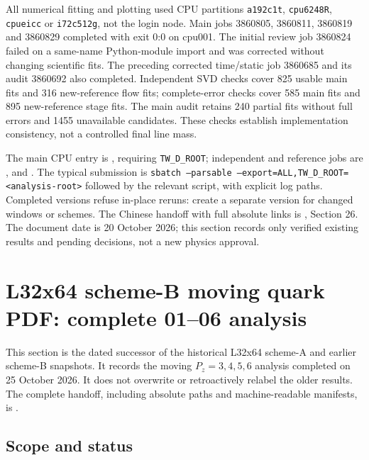 \documentclass[11pt]{article}
\numberwithin{equation}{section}
\begin{document}
All numerical fitting and plotting used CPU partitions
\texttt{a192c1t}, \texttt{cpu6248R}, \texttt{cpueicc} or
\texttt{i72c512g}, not the login node. Main jobs 3860805, 3860811,
3860819 and 3860829 completed with exit 0:0 on cpu001. The initial review
job 3860824 failed on a same-name Python-module import and was corrected
without changing scientific fits. The preceding corrected time/static
job 3860685 and its audit 3860692 also completed. Independent SVD checks
cover 825 usable main fits and 316 new-reference flow fits; complete-error
checks cover 585 main fits and 895 new-reference stage fits. The main
audit retains 240 partial fits without full errors and 1455 unavailable
candidates. These checks establish implementation consistency, not a
controlled final line mass.

The main CPU entry is , requiring
\texttt{TW\_D\_ROOT}; independent and reference jobs are
,  and
. The typical submission is
\texttt{sbatch --parsable --export=ALL,TW\_D\_ROOT=<analysis-root>}
followed by the relevant script, with explicit log paths. Completed
versions refuse in-place reruns: create a separate version for changed
windows or schemes. The Chinese handoff with full absolute links is
, Section 26.
The document date is 20 October 2026; this section records only verified
existing results and pending decisions, not a new physics approval.

\clearpage
\section{L32x64 scheme-B moving quark PDF: complete 01--06 analysis}
\label{sec:l32x64-moving-20261025}

This section is the dated successor of the historical L32x64 scheme-A
and earlier scheme-B snapshots.  It records the moving \(P_z=3,4,5,6\)
analysis completed on 25 October 2026.  It does not overwrite or
retroactively relabel the older results.  The complete handoff, including
absolute paths and machine-readable manifests, is
.

\subsection{Scope and status}
\end{document}

